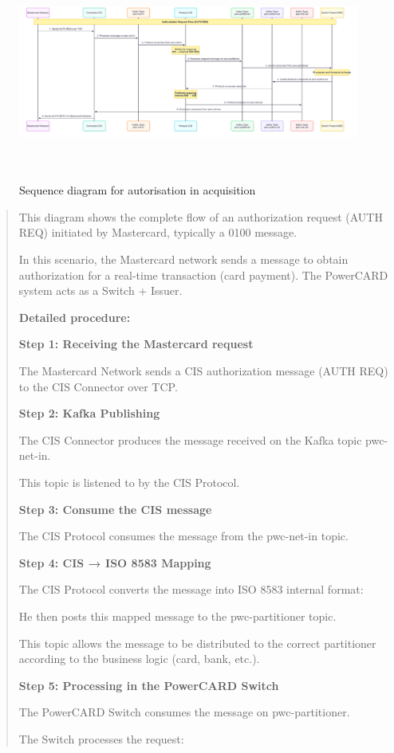 \documentclass[12pt,a4paper]{report}
\begin{document}
\begin{figure}[H]
\centering
\includegraphics[width=7.21985in,height=2.8089in]{media/image38.png}
\caption{Sequence diagram for autorisation in acquisition}
\label{fig:SDAA}
\end{figure}

\begin{quote}
This diagram shows the complete flow of an authorization request (AUTH
REQ) initiated by Mastercard, typically a 0100 message.

In this scenario, the Mastercard network sends a message to obtain
authorization for a real-time transaction (card payment). The PowerCARD
system acts as a Switch + Issuer.

\textbf{Detailed procedure:}

\textbf{Step 1: Receiving the Mastercard request}

The Mastercard Network sends a CIS authorization message (AUTH REQ) to
the CIS Connector over TCP.

\textbf{Step 2: Kafka Publishing}

The CIS Connector produces the message received on the Kafka topic
pwc-net-in.

This topic is listened to by the CIS Protocol.

\textbf{Step 3: Consume the CIS message}

The CIS Protocol consumes the message from the pwc-net-in topic.

\textbf{Step 4: CIS → ISO 8583 Mapping}

The CIS Protocol converts the message into ISO 8583 internal format:

He then posts this mapped message to the pwc-partitioner topic.

This topic allows the message to be distributed to the correct
partitioner according to the business logic (card, bank, etc.).

\textbf{Step 5: Processing in the PowerCARD Switch}

The PowerCARD Switch consumes the message on pwc-partitioner.

The Switch processes the request:
\end{quote}
\end{document}
